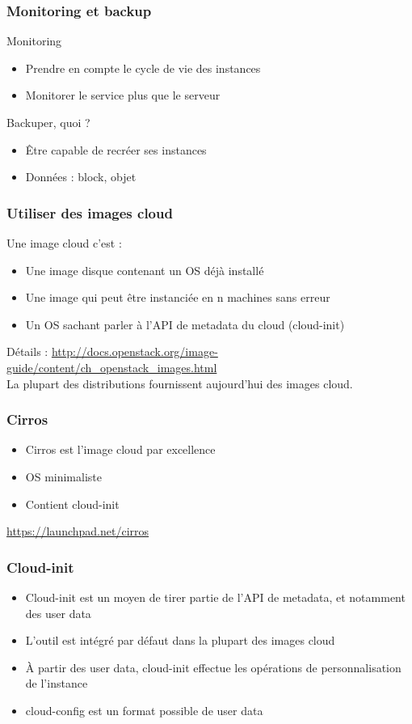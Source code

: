   \begin{frame}
    \frametitle{Monitoring et backup}
    Monitoring
    \begin{itemize}
      \item Prendre en compte le cycle de vie des instances
      \item Monitorer le service plus que le serveur
    \end{itemize}
    Backuper, quoi ?
    \begin{itemize}
      \item Être capable de recréer ses instances
      \item Données : block, objet
    \end{itemize}
  \end{frame}

  \begin{frame}
    \frametitle{Utiliser des images cloud}
    Une image cloud c'est :
    \begin{itemize}
      \item Une image disque contenant un OS déjà installé
      \item Une image qui peut être instanciée en n machines sans erreur
      \item Un OS sachant parler à l'API de metadata du cloud (cloud-init)
    \end{itemize}
    Détails : \url{http://docs.openstack.org/image-guide/content/ch\_openstack\_images.html}\\
    La plupart des distributions fournissent aujourd'hui des images cloud.
  \end{frame}

  \begin{frame}
    \frametitle{Cirros}
    \begin{itemize}
      \item Cirros est l'image cloud par excellence
      \item OS minimaliste
      \item Contient cloud-init
    \end{itemize}
    \url{https://launchpad.net/cirros}
  \end{frame}

  \begin{frame}
    \frametitle{Cloud-init}
    \begin{itemize}
      \item Cloud-init est un moyen de tirer partie de l'API de metadata, et notamment des user data
      \item L'outil est intégré par défaut dans la plupart des images cloud
      \item À partir des user data, cloud-init effectue les opérations de personnalisation de l'instance
      \item cloud-config est un format possible de user data
    \end{itemize}
  \end{frame}

